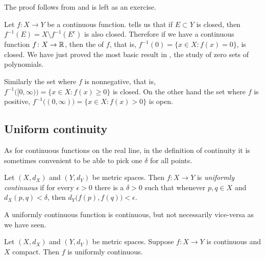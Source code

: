 The proof follows from  and is left as
an exercise.

\begin{example}
Let $f \colon X \to Y$ be a continuous function.
 tells us that if $E \subset Y$ is closed, then 
$f^{-1}(E) = X \setminus f^{-1}(E^c)$ is also closed.  Therefore if
we have a continuous
function $f \colon X \to {\mathbb{R}}$, then the
\emph{} of $f$, that is, 
$f^{-1}(0) = \{ x \in X :
f(x) = 0 \}$, is closed.  We have just proved the most basic result in
\emph{}, the study of
zero sets of polynomials.

Similarly the set where $f$ is nonnegative, that is,
$f^{-1}\bigl( [0,\infty) \bigr) = \{ x \in X :
f(x) \geq 0 \}$ is closed.  On the other hand the
set where $f$ is positive,
$f^{-1}\bigl( (0,\infty) \bigr) = \{ x \in X :
f(x) > 0 \}$ is open.  
\end{example}

\subsection{Uniform continuity}

As for continuous
functions on the real line, in the definition of continuity
it is sometimes convenient to be able to pick
one $\delta$ for all points.

\begin{defn}
Let $(X,d_X)$ and $(Y,d_Y)$ be metric spaces.
Then $f \colon X \to Y$ is
\emph{uniformly continuous}
if for every $\epsilon > 0$
there is a $\delta > 0$ such that whenever $p,q \in X$ and $d_X(p,q) <
\delta$, then
$d_Y\bigl(f(p),f(q)\bigr) < \epsilon$.
\end{defn}

A uniformly continuous function is continuous, but not necessarily
vice-versa as we have seen.

\begin{thm} \label{thm:Xcompactfunifcont}
Let $(X,d_X)$ and $(Y,d_Y)$ be metric spaces.
Suppose $f \colon X \to Y$ is continuous and $X$ compact.  Then
$f$ is uniformly continuous.
\end{thm}

